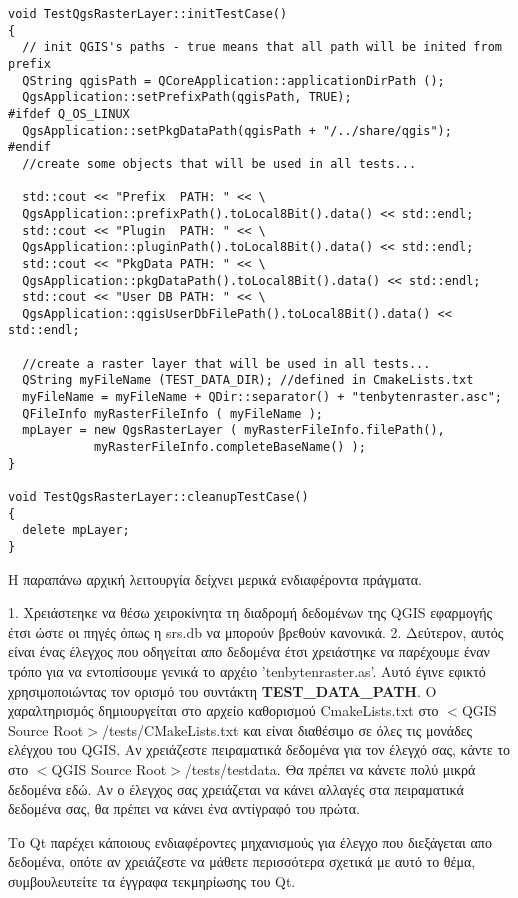 \begin{verbatim}
void TestQgsRasterLayer::initTestCase()
{
  // init QGIS's paths - true means that all path will be inited from prefix
  QString qgisPath = QCoreApplication::applicationDirPath ();
  QgsApplication::setPrefixPath(qgisPath, TRUE);
#ifdef Q_OS_LINUX
  QgsApplication::setPkgDataPath(qgisPath + "/../share/qgis");
#endif
  //create some objects that will be used in all tests...

  std::cout << "Prefix  PATH: " << \
  QgsApplication::prefixPath().toLocal8Bit().data() << std::endl;
  std::cout << "Plugin  PATH: " << \
  QgsApplication::pluginPath().toLocal8Bit().data() << std::endl;
  std::cout << "PkgData PATH: " << \
  QgsApplication::pkgDataPath().toLocal8Bit().data() << std::endl;
  std::cout << "User DB PATH: " << \
  QgsApplication::qgisUserDbFilePath().toLocal8Bit().data() << std::endl;

  //create a raster layer that will be used in all tests...
  QString myFileName (TEST_DATA_DIR); //defined in CmakeLists.txt
  myFileName = myFileName + QDir::separator() + "tenbytenraster.asc";
  QFileInfo myRasterFileInfo ( myFileName );
  mpLayer = new QgsRasterLayer ( myRasterFileInfo.filePath(),
            myRasterFileInfo.completeBaseName() );
}

void TestQgsRasterLayer::cleanupTestCase()
{
  delete mpLayer;
}

\end{verbatim}

Η παραπάνω αρχική λειτουργία δείχνει μερικά ενδιαφέροντα πράγματα. 

 1. Χρειάστεηκε να θέσω χειροκίνητα τη διαδρομή δεδομένων της QGIS εφαρμογής έτσι ώστε οι πηγές όπως η srs.db να μπορούν βρεθούν κανονικά.
 2. Δεύτερον, αυτός είναι ένας έλεγχος που οδηγείται απο δεδομένα έτσι χρειάστηκε να παρέχουμε έναν τρόπο για να εντοπίσουμε γενικά το αρχέιο 'tenbytenraster.as'. Αυτό έγινε εφικτό χρησιμοποιώντας τον ορισμό του συντάκτη \textbf{TEST\_DATA\_PATH}.  Ο χαραλτηρισμός δημιουργείται στο αρχείο καθορισμού CmakeLists.txt στο $<$QGIS Source Root$>$/tests/CMakeLists.txt και είναι διαθέσιμο σε όλες τις μονάδες ελέγχου του QGIS. Αν χρειάζεστε πειραματικά δεδομένα για τον έλεγχό σας, κάντε το στο $<$QGIS Source Root$>$/tests/testdata. Θα πρέπει να κάνετε πολύ μικρά δεδομένα εδώ. Αν ο έλεγχος σας χρειάζεται να κάνει αλλαγές στα πειραματικά δεδομένα σας, θα πρέπει να κάνει ένα αντίγραφό του πρώτα.

Το Qt παρέχει κάποιους ενδιαφέροντες μηχανισμούς για έλεγχο που διεξάγεται απο δεδομένα, οπότε αν χρειάζεστε να μάθετε περισσότερα σχετικά με αυτό το θέμα, συμβουλευτείτε τα έγγραφα τεκμηρίωσης του Qt. 

